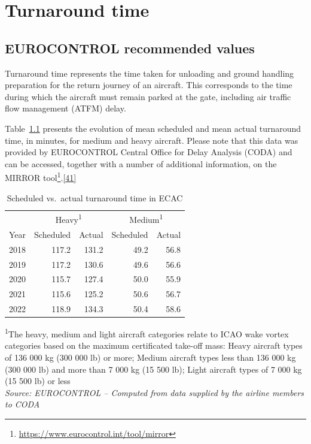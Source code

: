 \documentclass[
  11pt,
  a4paper,
]{book}
\DeclareRobustCommand{\href}[2]{#2\footnote{\url{#1}}}
\begin{document}
\hypertarget{sec-turnaround-time}{%
\chapter{Turnaround time}\label{sec-turnaround-time}}

\hypertarget{eurocontrol-recommended-values-15}{%
\section{EUROCONTROL recommended
values}\label{eurocontrol-recommended-values-15}}

Turnaround time represents the time taken for unloading and ground
handling preparation for the return journey of an aircraft. This
corresponds to the time during which the aircraft must remain parked at
the gate, including air traffic flow management (ATFM) delay.

Table~\ref{tbl-turnaround-time} presents the evolution of mean scheduled
and mean actual turnaround time, in minutes, for medium and heavy
aircraft. Please note that this data was provided by EUROCONTROL Central
Office for Delay Analysis (CODA) and can be accessed, together with a
number of additional information, on the
\href{https://www.eurocontrol.int/tool/mirror}{MIRROR
tool}.\protect\hyperlink{ref-coda:mirror}{{[}41{]}}

\hypertarget{tbl-turnaround-time}{}
\setlength{\LTpost}{0mm}
\begin{longtable}{lrrrr}
\caption{\label{tbl-turnaround-time}Scheduled vs.~actual turnaround time in ECAC }\tabularnewline

\toprule
 & \multicolumn{2}{c}{Heavy\textsuperscript{1}} & \multicolumn{2}{c}{Medium\textsuperscript{1}} \\ 
\cmidrule(lr){2-3} \cmidrule(lr){4-5}
Year & Scheduled & Actual & Scheduled & Actual \\ 
\midrule
2018 & 117.2 & 131.2 & 49.2 & 56.8 \\ 
2019 & 117.2 & 130.6 & 49.6 & 56.6 \\ 
2020 & 115.7 & 127.4 & 50.0 & 55.9 \\ 
2021 & 115.6 & 125.2 & 50.6 & 56.7 \\ 
2022 & 118.9 & 134.3 & 50.4 & 58.6 \\ 
\bottomrule
\end{longtable}
\begin{minipage}{\linewidth}
\textsuperscript{1}The heavy, medium and light aircraft categories relate to ICAO wake vortex categories based on the maximum certificated take-off mass: Heavy aircraft types of 136 000 kg (300 000 lb) or more; Medium aircraft types less than 136 000 kg (300 000 lb) and more than 7 000 kg (15 500 lb); Light aircraft types of 7 000 kg (15 500 lb) or less\\
\emph{Source: EUROCONTROL -- Computed from data supplied by the airline members to CODA}\\
\end{minipage}
\end{document}
